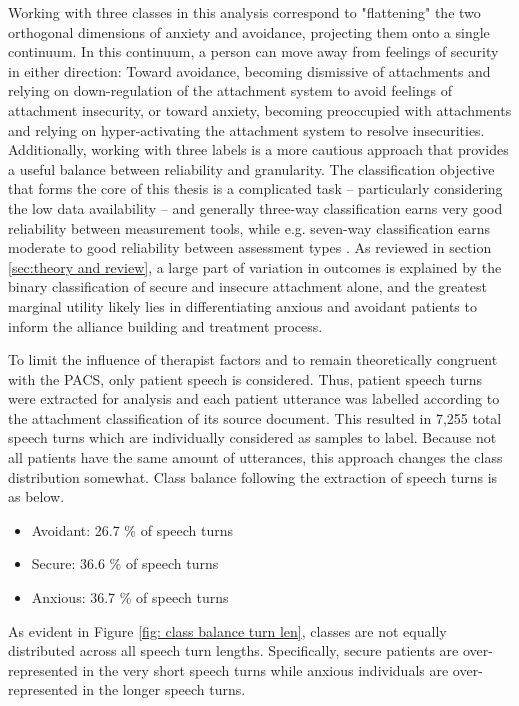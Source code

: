 \documentclass[12pt]{report}
\begin{document}
Working with three classes in this analysis correspond to "flattening" the two orthogonal dimensions of anxiety and avoidance, projecting them onto a single continuum.
In this continuum, a person can move away from feelings of security in either direction: Toward avoidance, becoming dismissive of attachments and relying on down-regulation of the attachment system to avoid feelings of attachment insecurity, or toward anxiety, becoming preoccupied with attachments and relying on hyper-activating the attachment system to resolve insecurities.
Additionally, working with three labels is a more cautious approach that provides a useful balance between reliability and granularity.
The classification objective that forms the core of this thesis is a complicated task -- particularly considering the low data availability -- and generally three-way classification earns very good reliability between measurement tools, while e.g. seven-way classification earns moderate to good reliability between assessment types \cite{Talia2020, Talia2014}.
As reviewed in section \ref{sec:theory and review}, a large part of variation in outcomes is explained by the binary classification of secure and insecure attachment alone, and the greatest marginal utility likely lies in differentiating anxious and avoidant patients to inform the alliance building and treatment process.

To limit the influence of therapist factors and to remain theoretically congruent with the PACS, only patient speech is considered.
Thus, patient speech turns were extracted for analysis and each patient utterance was labelled according to the attachment classification of its source document.
This resulted in 7,255 total speech turns which are individually considered as samples to label.
Because not all patients have the same amount of utterances, this approach changes the class distribution somewhat.
Class balance following the extraction of speech turns is as below.
\begin{itemize}
    \item {Avoidant: 26.7 \% of speech turns}
    \item {Secure: 36.6 \% of speech turns}
    \item {Anxious: 36.7 \% of speech turns}
\end{itemize}

As evident in Figure \ref{fig: class balance turn len}, classes are not equally distributed across all speech turn lengths.
Specifically, secure patients are over-represented in the very short speech turns while anxious individuals are over-represented in the longer speech turns.
\end{document}
